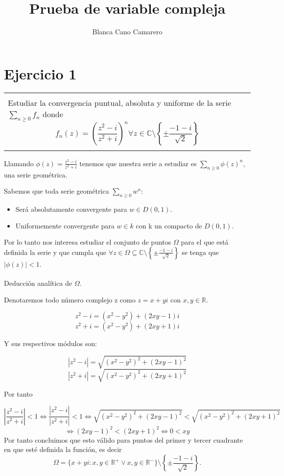 \documentclass[12pt]{article}
\title{Prueba de variable compleja}
\author{Blanca Cano Camarero}
\newenvironment{micaja}
{
    \begin{center}
    \begin{tabular}{|p{0.9\textwidth}|}
    \hline\\
    }   
    {   
    \\\\\hline
    \end{tabular} 
    \end{center}
    }
\begin{document}
\begin{titlepage}
\maketitle
\tableofcontents
\end{titlepage}

\section{Ejercicio 1}

\begin{micaja}
    Estudiar la convergencia puntual, absoluta y uniforme de la serie $\sum_{n \geq 0} f_n$ donde
    $$f_n(z) = \left( \frac{z^2 - i}{z^2+i} \right)^n \forall z \in \mathbb C \setminus  \left\{ \pm  \frac{-1-i}{\sqrt{2}} \right\}$$
\end{micaja}


Llamando $\phi(z) = \frac{z^2 - i}{z^2+i}$ tenemos que nuestra serie a estudiar 
 es $\sum_{n \geq 0} \phi(z)^n$, una serie geométrica. \par
 Sabemos que toda serie geométrica $\sum_{n \geq 0} w^n$: 

 \begin{itemize}
     \item Será absolutamente convergente para $w \in D(0,1).$
     \item Uniformemente convergente para $w \in k$ con k un compacto de $D(0,1).$
 \end{itemize}
Por lo tanto nos interesa estudiar el conjunto de puntos $\Omega$ para el que está definida la
serie y que cumpla que  $\forall z \in \Omega \subseteq \mathbb C \setminus  \left\{ \pm  \frac{-1-i}{\sqrt{2}} \right\}$ 
se tenga que  $|\phi(z)|<1$. \paragraph{}
 Deducción  analítica de $\Omega$.

Denotaremos todo número complejo z como $z = x+yi$ con $x,y \in \mathbb R.$

$$z^2-i = (x^2 - y^2) + (2xy -1)i$$
$$z^2+i = (x^2 - y^2)+(2xy + 1)i$$

Y sus respectivos módulos son: 

$$|z^2-i| = \sqrt{ (x^2 - y^2)^2 + (2xy -1)^2}$$
$$|z^2+i| = \sqrt{ (x^2 - y^2)^2 + (2xy +1)^2}$$

Por tanto 

$$\left| \frac{z^2-i}{z^2+i} \right| <1 \Longleftrightarrow \frac{|z^2-i|}{|z^2+i|}<1 \Longleftrightarrow \sqrt{ (x^2 - y^2)^2 + (2xy -1)^2} < \sqrt{ (x^2 - y^2)^2 + (2xy +1)^2}$$
$$\Longleftrightarrow(2xy-1)^2 <(2xy+1)^2 \Longleftrightarrow 0 < xy$$
Por tanto concluimos que esto válido para puntos del primer y tercer cuadrante en que esté definida la función, 
es decir 
$$\Omega = \{ x+yi  :   x,y \in \mathbb R^+ \vee x,y \in \mathbb R^-\} \setminus  \left\{ \pm  \frac{-1-i}{\sqrt{2}} \right\}.$$
\end{document}
